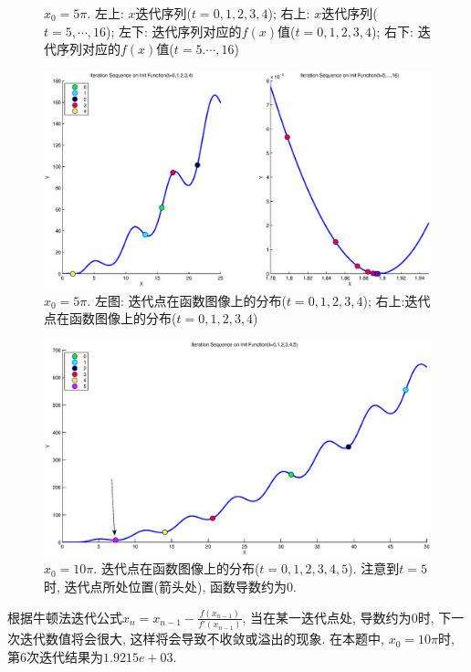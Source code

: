 \documentclass{article}
\begin{document}
\begin{CJK*}{UTF8}{song}
\begin{figure}[H]
					\caption{$x_0 = 5\pi$. 左上: $x$迭代序列($t = 0,1,2,3,4$); 右上: $x$迭代序列($t = 5,\cdots,16$); 左下: 迭代序列对应的$f\left(x\right)$值($t = 0,1,2,3,4$); 右下: 迭代序列对应的$f\left(x\right)$值($t = 5.\cdots,16$)}
					\label{img_chapter2_3_3}
				\end{figure}
				\begin{figure}[H]
					\centering
					\includegraphics[width=1.0\textwidth]{../chapter2_3_4.eps}
					\caption{$x_0 = 5\pi$. 左图: 迭代点在函数图像上的分布($t = 0,1,2,3,4$); 右上:迭代点在函数图像上的分布($t = 0,1,2,3,4$)}
					\label{img_chapter2_3_4}
				\end{figure}
				\begin{figure}[H]
					\centering
					\includegraphics[width=1.0\textwidth]{../chapter2_3_5.eps}
					\caption{$x_0 = 10\pi$. 迭代点在函数图像上的分布($t = 0,1,2,3,4,5$). 注意到$t=5$时, 迭代点所处位置(箭头处), 函数导数约为$0$.}
					\label{img_chapter2_3_5}
				\end{figure}
			
				根据牛顿法迭代公式$x_n = x_{n-1} - \frac{f\left(x_{n-1} \right)}{f'\left(x_{n-1} \right)}$, 当在某一迭代点处, 导数约为$0$时, 下一次迭代数值将会很大, 这样将会导致不收敛或溢出的现象. 在本题中, $x_0=10\pi $时, 第6次迭代结果为$1.9215e+03$.
				

\end{CJK*}
\end{document}
